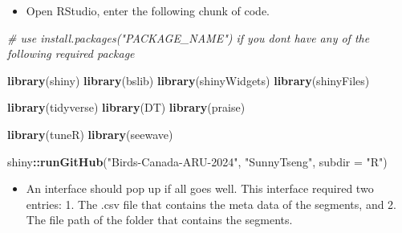 \documentclass[
]{article}
\newenvironment{Shaded}{\begin{snugshade}}{\end{snugshade}}
\newcommand{\AttributeTok}[1]{\textcolor[rgb]{0.13,0.29,0.53}{#1}}
\newcommand{\CommentTok}[1]{\textcolor[rgb]{0.56,0.35,0.01}{\textit{#1}}}
\newcommand{\FunctionTok}[1]{\textcolor[rgb]{0.13,0.29,0.53}{\textbf{#1}}}
\newcommand{\NormalTok}[1]{#1}
\newcommand{\SpecialCharTok}[1]{\textcolor[rgb]{0.81,0.36,0.00}{\textbf{#1}}}
\newcommand{\StringTok}[1]{\textcolor[rgb]{0.31,0.60,0.02}{#1}}
\providecommand{\tightlist}{%
  \setlength{\itemsep}{0pt}\setlength{\parskip}{0pt}}
\begin{document}
\begin{itemize}
\tightlist
\item
  Open RStudio, enter the following chunk of code.
\end{itemize}

\begin{Shaded}
\begin{Highlighting}[]
\CommentTok{\# use install.packages("PACKAGE\_NAME") if you don\textquotesingle{}t have any of the following required package}

\FunctionTok{library}\NormalTok{(shiny) }
\FunctionTok{library}\NormalTok{(bslib)}
\FunctionTok{library}\NormalTok{(shinyWidgets) }
\FunctionTok{library}\NormalTok{(shinyFiles)}

\FunctionTok{library}\NormalTok{(tidyverse)}
\FunctionTok{library}\NormalTok{(DT)}
\FunctionTok{library}\NormalTok{(praise)}

\FunctionTok{library}\NormalTok{(tuneR)}
\FunctionTok{library}\NormalTok{(seewave)}

\NormalTok{shiny}\SpecialCharTok{::}\FunctionTok{runGitHub}\NormalTok{(}\StringTok{"Birds{-}Canada{-}ARU{-}2024"}\NormalTok{, }\StringTok{"SunnyTseng"}\NormalTok{, }\AttributeTok{subdir =} \StringTok{"R"}\NormalTok{)}
\end{Highlighting}
\end{Shaded}

\begin{itemize}
\tightlist
\item
  An interface should pop up if all goes well. This interface required
  two entries: 1. The .csv file that contains the meta data of the
  segments, and 2. The file path of the folder that contains the
  segments.
\end{itemize}
\end{document}

